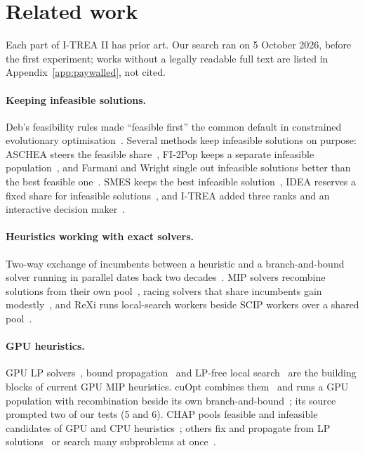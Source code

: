 \section{Related work}\label{sec:related}
Each part of I-TREA II has prior art. Our search ran on 5 October 2026, before the first experiment; works without a
legally readable full text are listed in Appendix~\ref{app:paywalled}, not cited.

\paragraph{Keeping infeasible solutions.} Deb's feasibility rules made ``feasible first'' the common default in
constrained evolutionary optimisation~\citep{deb2000efficient,coello2002survey,mezuramontes2011survey}. Several methods
keep infeasible solutions on purpose: ASCHEA steers the feasible share~\citep{hamida2000aschea}, FI-2Pop keeps a
separate infeasible population~\citep{kimbrough2008fi2pop}, and Farmani and Wright single out infeasible solutions
better than the best feasible one~\citep{farmani2003selfadaptive}. SMES keeps the best infeasible
solution~\citep{mezuramontes2005smes}, IDEA reserves a fixed share for infeasible solutions~\citep{singh2011thesis},
and I-TREA added three ranks and an interactive decision maker~\citep{orbay2011itrea}.

\paragraph{Heuristics working with exact solvers.} Two-way exchange of incumbents between a heuristic and a
branch-and-bound solver running in parallel dates back two decades~\citep{nwana2005cooperative,puchinger2005cooperating,
puchinger2005combining,gallardo2007mabnb}. MIP solvers recombine solutions from their own pool~\citep{berthold2006primal,
hendel2022alns}, racing solvers that share incumbents gain modestly~\citep{ralphs2018parallel,
carvajal2014diversification,shinano2018fiberscip}, and ReXi runs local-search workers beside SCIP workers over a shared
pool~\citep{mexi2026rexi}.

\paragraph{GPU heuristics.} GPU LP solvers~\citep{applegate2021pdlp,lu2023cupdlp}, bound
propagation~\citep{sofranac2022domainprop} and LP-free local search~\citep{luteberget2023feasibility,lin2024localmip}
are the building blocks of current GPU MIP heuristics. cuOpt combines them~\citep{corduk2025gpuprimal} and runs a GPU
population with recombination beside its own branch-and-bound~\citep{corduk2025evoframework,nvidia2026cuoptsrc}; its
source prompted two of our tests (5 and 6). CHAP pools feasible and infeasible candidates of GPU and CPU
heuristics~\citep{tjusila2026chap}; others fix and propagate from LP solutions~\citep{kempke2025fixprop} or
search many subproblems at once~\citep{pauphilet2026pangea,sim2026ptilp}.

